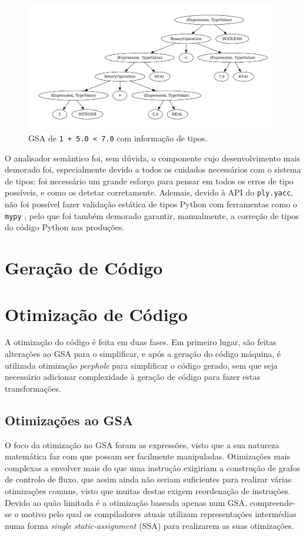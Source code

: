 \documentclass[12pt, a4paper]{article}
\begin{document}
\begin{figure}[H]
    \centering
    \includegraphics[width=\textwidth]{res/expression-types.pdf}
    \caption{GSA de \texttt{1 + 5.0 < 7.0} com informação de tipos.}
\end{figure}

O analisador semântico foi, sem dúvida, o componente cujo desenvolvimento mais demorado foi,
especialmente devido a todos os cuidados necessários com o sistema de tipos: foi necessário um
grande esforço para pensar em todos os erros de tipo possíveis, e como os detetar corretamente.
Ademais, devido à API do \texttt{ply.yacc}, não foi possível fazer validação estática de tipos
Python com ferramentas como o \texttt{mypy} \cite{mypy}, pelo que foi também demorado garantir,
manualmente, a correção de tipos do código Python nas produções.

\section{Geração de Código}

\section{Otimização de Código}

A otimização do código é feita em duas fases. Em primeiro lugar, são feitas alterações ao GSA para o
simplificar, e após a geração do código máquina, é utilizada otimização \emph{peephole} para
simplificar o código gerado, sem que seja necessário adicionar complexidade à geração de código para
fazer estas transformações.

\subsection{Otimizações ao GSA}

O foco da otimização no GSA foram as expressões, visto que a sua natureza matemática faz com que
possam ser facilmente manipuladas. Otimizações mais complexas a envolver mais do que uma instrução
exigiriam a construção de grafos de controlo de fluxo, que assim ainda não seriam suficientes para
realizar várias otimizações comuns, visto que muitas destas exigem reordenação de instruções. Devido
ao quão limitada é a otimização baseada apenas num GSA, compreende-se o motivo pelo qual os
compiladores atuais utilizam representações intermédias numa forma \emph{single static-assignment}
(SSA) para realizarem as suas otimizações.
\end{document}
